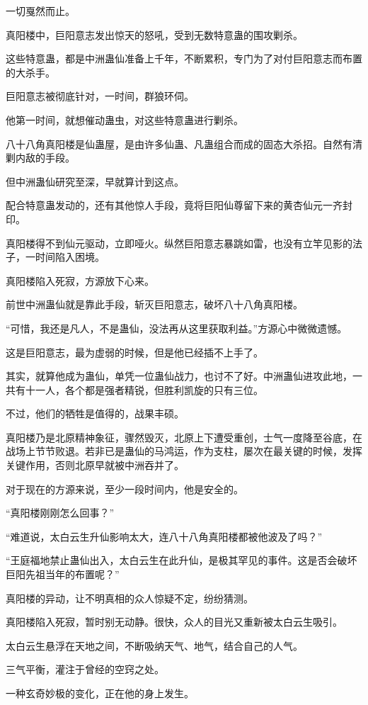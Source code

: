 \begin{this_body}
一切戛然而止。

真阳楼中，巨阳意志发出惊天的怒吼，受到无数特意蛊的围攻剿杀。

这些特意蛊，都是中洲蛊仙准备上千年，不断累积，专门为了对付巨阳意志而布置的大杀手。

巨阳意志被彻底针对，一时间，群狼环伺。

他第一时间，就想催动蛊虫，对这些特意蛊进行剿杀。

八十八角真阳楼是仙蛊屋，是由许多仙蛊、凡蛊组合而成的固态大杀招。自然有清剿内敌的手段。

但中洲蛊仙研究至深，早就算计到这点。

配合特意蛊发动的，还有其他惊人手段，竟将巨阳仙尊留下来的黄杏仙元一齐封印。

真阳楼得不到仙元驱动，立即哑火。纵然巨阳意志暴跳如雷，也没有立竿见影的法子，一时间陷入困境。

真阳楼陷入死寂，方源放下心来。

前世中洲蛊仙就是靠此手段，斩灭巨阳意志，破坏八十八角真阳楼。

“可惜，我还是凡人，不是蛊仙，没法再从这里获取利益。”方源心中微微遗憾。

这是巨阳意志，最为虚弱的时候，但是他已经插不上手了。

其实，就算他成为蛊仙，单凭一位蛊仙战力，也讨不了好。中洲蛊仙进攻此地，一共有十一人，各个都是强者精锐，但胜利凯旋的只有三位。

不过，他们的牺牲是值得的，战果丰硕。

真阳楼乃是北原精神象征，骤然毁灭，北原上下遭受重创，士气一度降至谷底，在战场上节节败退。若非已是蛊仙的马鸿运，作为支柱，屡次在最关键的时候，发挥关键作用，否则北原早就被中洲吞并了。

对于现在的方源来说，至少一段时间内，他是安全的。

“真阳楼刚刚怎么回事？”

“难道说，太白云生升仙影响太大，连八十八角真阳楼都被他波及了吗？”

“王庭福地禁止蛊仙出入，太白云生在此升仙，是极其罕见的事件。这是否会破坏巨阳先祖当年的布置呢？”

真阳楼的异动，让不明真相的众人惊疑不定，纷纷猜测。

真阳楼陷入死寂，暂时别无动静。很快，众人的目光又重新被太白云生吸引。

太白云生悬浮在天地之间，不断吸纳天气、地气，结合自己的人气。

三气平衡，灌注于曾经的空窍之处。

一种玄奇妙极的变化，正在他的身上发生。


\end{this_body}
